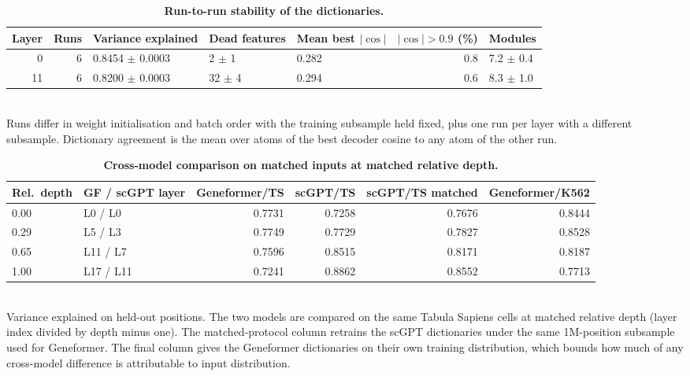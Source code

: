 \documentclass[11pt]{article}
\begin{document}
\begin{table}[htbp]
\centering
\caption{\textbf{Run-to-run stability of the dictionaries.}}
\label{tab:seed_stability}
\smallskip
\small
\begin{tabular}{rrlllrl}
\toprule
Layer & Runs & Variance explained & Dead features & Mean best $|\cos|$ & $|\cos| > 0.9$ (\%) & Modules \\
\midrule
0 & 6 & 0.8454 $\pm$ 0.0003 & 2 $\pm$ 1 & 0.282 & 0.8 & 7.2 $\pm$ 0.4 \\
11 & 6 & 0.8200 $\pm$ 0.0003 & 32 $\pm$ 4 & 0.294 & 0.6 & 8.3 $\pm$ 1.0 \\
\bottomrule
\end{tabular}
\\[2pt]
\footnotesize Runs differ in weight initialisation and batch order with the training subsample held fixed, plus one run per layer with a different subsample. Dictionary agreement is the mean over atoms of the best decoder cosine to any atom of the other run.
\end{table}

\begin{table}[htbp]
\centering
\caption{\textbf{Cross-model comparison on matched inputs at matched relative depth.}}
\label{tab:crossmodel}
\smallskip
\small
\begin{tabular}{llrrrr}
\toprule
Rel.\ depth & GF / scGPT layer & Geneformer/TS & scGPT/TS & scGPT/TS matched & Geneformer/K562 \\
\midrule
0.00 & L0 / L0 & 0.7731 & 0.7258 & 0.7676 & 0.8444 \\
0.29 & L5 / L3 & 0.7749 & 0.7729 & 0.7827 & 0.8528 \\
0.65 & L11 / L7 & 0.7596 & 0.8515 & 0.8171 & 0.8187 \\
1.00 & L17 / L11 & 0.7241 & 0.8862 & 0.8552 & 0.7713 \\
\bottomrule
\end{tabular}
\\[2pt]
\footnotesize Variance explained on held-out positions. The two models are compared on the same Tabula Sapiens cells at matched relative depth (layer index divided by depth minus one). The matched-protocol column retrains the scGPT dictionaries under the same 1M-position subsample used for Geneformer. The final column gives the Geneformer dictionaries on their own training distribution, which bounds how much of any cross-model difference is attributable to input distribution.
\end{table}
\end{document}

